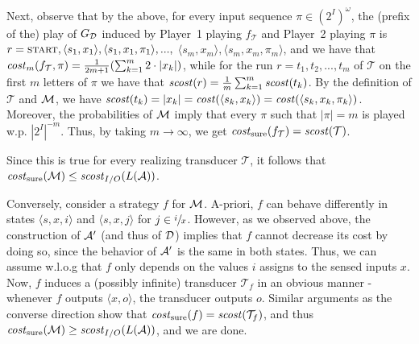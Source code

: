 \documentclass[runningheads,a4paper]{llncs}
\newcommand{\zug}[1]{\langle #1  \rangle}
\newcommand{\T}{{\mathcal T}}
\newcommand{\A}{{\cal A}}
\newcommand{\D}{{\cal D}}
\newcommand{\M}{{\cal M}}
\newcommand{\scost}{{\it scost}}
\newcommand{\cost}{{\it cost}}
\newcommand{\tIN}{{2^I}}
\newcommand{\tINo}{{{(2^I)}^\omega}}
\newcommand{\MDPcost}{{\it cost}}
\newcommand{\start}{{\textsc{start}}}
\newcommand{\costs}{{\it cost}_{\rm sure}}
\begin{document}
Next, observe that by the above, for every input sequence $\pi\in \tINo$, the (prefix of the) play of $G_\D$ induced by Player~1 playing $f_\T$ and Player~2 playing $\pi$ is $r=\start,\zug{s_1,x_1},\zug{s_1,x_1,\pi_1},...,$ $\zug{s_m,x_m},\zug{s_m,x_m,\pi_m}$, and we have that $\cost_m(f_\T,\pi)=\frac{1}{2m+1}(\sum_{k=1}^m 2\cdot|x_k|)$, while for the run $r=t_1,t_2,...,t_m$ of $\T$ on the first $m$ letters of $\pi$ we have that $\scost(r)=\frac{1}{m}\sum_{k=1}^m \scost(t_k)$. By the definition of $\T$ and $\M$, we have $\scost(t_k)=|x_k|=\MDPcost(\zug{s_k,x_k})=\MDPcost(\zug{s_k,x_k,\pi_k})$. Moreover, the probabilities of $\M$ imply that every $\pi$ such that $|\pi|=m$ is played w.p. $|\tIN|^{-m}$. Thus, by taking $m\to \infty$, we get $\costs(f_\T)=\scost(\T)$. 

Since this is true for every realizing transducer $\T$, it follows that $\costs(\M)\le\scost_{I/O}(L(\A))$.

Conversely, consider a strategy $f$ for $\M$. A-priori, $f$ can behave differently in states $\zug{s,x,i}$ and $\zug{s,x,j}$ for $j\in \sfrac{i}{x}$. However, as we observed above, the construction of $\A'$ (and thus of $\D$) implies that $f$ cannot decrease its cost by doing so, since the behavior of $\A'$ is the same in both states. Thus, we can assume w.l.o.g that $f$ only depends on the values $i$ assigns to the sensed inputs $x$. Now, $f$ induces a (possibly infinite) transducer $\T_f$ in an obvious manner - whenever $f$ outputs $\zug{x,o}$, the transducer outputs $o$. Similar arguments as the converse direction show that $\costs(f)=\scost(\T_f)$, and thus $\costs(\M)\ge\scost_{I/O}(L(\A))$, and we are done.
\end{document}
